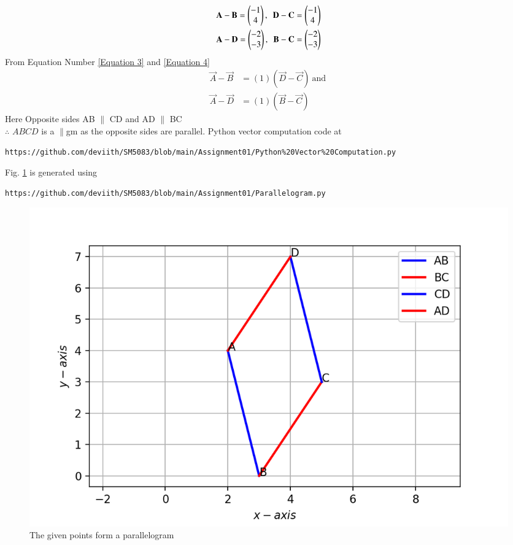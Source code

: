 \documentclass[journal,12pt,twocolumn]{IEEEtran}
\begin{document}
\begin{align}
\label{Equation 3}
\mathbf{A} - \mathbf{B} = \begin{pmatrix}-1\\4\end{pmatrix},~~
\mathbf{D} - \mathbf{C} = \begin{pmatrix}-1\\4\end{pmatrix}
\\
\mathbf {A} - \mathbf {D} = \begin{pmatrix}-2\\-3\end{pmatrix},~~
\mathbf {B} - \mathbf {C} =\begin{pmatrix}-2\\-3\end{pmatrix}
\label{Equation 4}
\end{align}
From Equation Number  
    \eqref{Equation 3} and \eqref{Equation 4}
\begin{align}
    \vec{A} - \vec{B} &= (1) ( \vec{D} - \vec{C} ) \nonumber
    ~\text{and}~\\
    \vec{A} - \vec{D}& = (1) ( \vec{B} - \vec{C} ) 
\end{align}
Here Opposite sides AB $\parallel$ CD and AD $\parallel$ BC \\
$\therefore$ $ABCD$ is a $\parallel$gm as the opposite sides are parallel.
%
\newline Python vector computation code  at
\begin{lstlisting}
https://github.com/deviith/SM5083/blob/main/Assignment01/Python%20Vector%20Computation.py
\end{lstlisting}
Fig. \ref{fig:parallelogram} is generated using 
\begin{lstlisting}
https://github.com/deviith/SM5083/blob/main/Assignment01/Parallelogram.py
\end{lstlisting}
\begin{figure}[!ht]
	\centering
	\includegraphics[width=\columnwidth]{Parallelogram.png}
	\caption{The given points form a parallelogram}
	\label{fig:parallelogram}
\end{figure}
\end{document}

